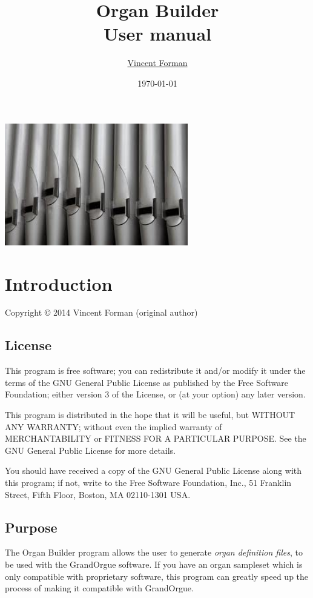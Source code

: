 \documentclass[a4paper,twoside,12pt]{extarticle}
\title{\bfseries Organ Builder\\User manual}
\date{\today}
\author{\href{mailto:vincent.forman@gmail.com}{Vincent Forman}}
\begin{document}
\vfill
\maketitle
\vfill
\begin{center}
\includegraphics[width=0.6\textwidth]{Pipes.png}
\end{center}
\vfill
\tableofcontents
\vfill
\newpage

\section{Introduction}

Copyright \copyright{} 2014 Vincent Forman (original author)

\subsection{License}

This program is free software; you can redistribute it and/or modify it under the terms of the GNU General Public License as published by the Free Software Foundation; either version 3 of the License, or (at your option) any later version. 

This program is distributed in the hope that it will be useful, but WITHOUT ANY WARRANTY; without even the implied warranty of MERCHANTABILITY or FITNESS FOR A PARTICULAR PURPOSE. See the GNU General Public License for more details. 

You should have received a copy of the GNU General Public License along with this program; if not, write to the Free Software Foundation, Inc., 51 Franklin Street, Fifth Floor, Boston, MA 02110-1301 USA.

\subsection{Purpose}

The Organ Builder program allows the user to generate \textit{organ definition files}, to be used with the GrandOrgue software. If you have an organ sampleset which is only compatible with proprietary software, this program can greatly speed up the process of making it compatible with GrandOrgue.
\end{document}
